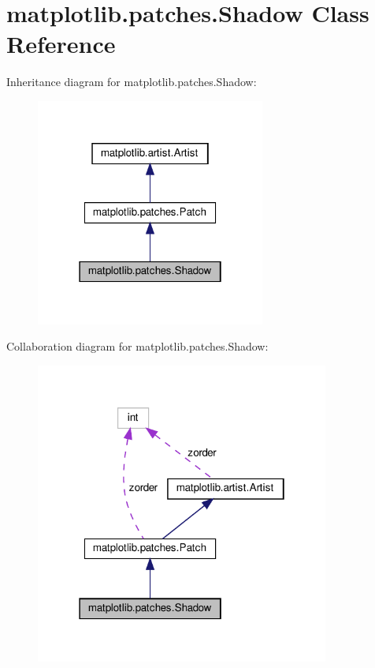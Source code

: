 \hypertarget{classmatplotlib_1_1patches_1_1Shadow}{}\section{matplotlib.\+patches.\+Shadow Class Reference}
\label{classmatplotlib_1_1patches_1_1Shadow}


Inheritance diagram for matplotlib.\+patches.\+Shadow\+:
\nopagebreak
\begin{figure}[H]
\begin{center}
\leavevmode
\includegraphics[width=214pt]{classmatplotlib_1_1patches_1_1Shadow__inherit__graph}
\end{center}
\end{figure}


Collaboration diagram for matplotlib.\+patches.\+Shadow\+:
\nopagebreak
\begin{figure}[H]
\begin{center}
\leavevmode
\includegraphics[width=274pt]{classmatplotlib_1_1patches_1_1Shadow__coll__graph}
\end{center}
\end{figure}
